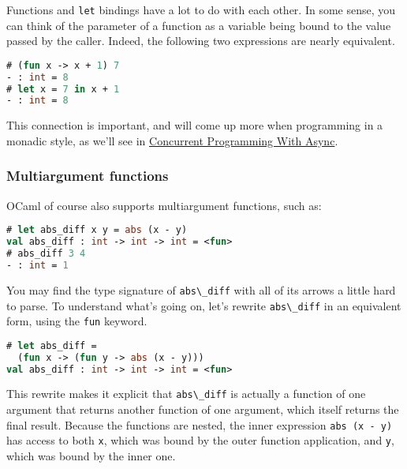 Functions and \passthrough{\lstinline!let!} bindings have a lot to do
with each other. In some sense, you can think of the parameter of a
function as a variable being bound to the value passed by the caller.
Indeed, the following two expressions are nearly equivalent.

\begin{lstlisting}[language=Caml]
# (fun x -> x + 1) 7
- : int = 8
# let x = 7 in x + 1
- : int = 8
\end{lstlisting}

This connection is important, and will come up more when programming in
a monadic style, as we'll see in
\href{concurrent-programming.html\#concurrent-programming-with-async}{Concurrent
Programming With Async}.

\hypertarget{multi-argument-functions}{%
\subsubsection{Multiargument functions}\label{multi-argument-functions}}

OCaml of course also supports multiargument functions, such
as:

\begin{lstlisting}[language=Caml]
# let abs_diff x y = abs (x - y)
val abs_diff : int -> int -> int = <fun>
# abs_diff 3 4
- : int = 1
\end{lstlisting}

You may find the type signature of \passthrough{\lstinline!abs\_diff!}
with all of its arrows a little hard to parse. To understand what's
going on, let's rewrite \passthrough{\lstinline!abs\_diff!} in an
equivalent form, using the \passthrough{\lstinline!fun!} keyword.

\begin{lstlisting}[language=Caml]
# let abs_diff =
  (fun x -> (fun y -> abs (x - y)))
val abs_diff : int -> int -> int = <fun>
\end{lstlisting}

This rewrite makes it explicit that \passthrough{\lstinline!abs\_diff!}
is actually a function of one argument that returns another function of
one argument, which itself returns the final result. Because the
functions are nested, the inner expression
\passthrough{\lstinline!abs (x - y)!} has access to both
\passthrough{\lstinline!x!}, which was bound by the outer function
application, and \passthrough{\lstinline!y!}, which was bound by the
inner one.


